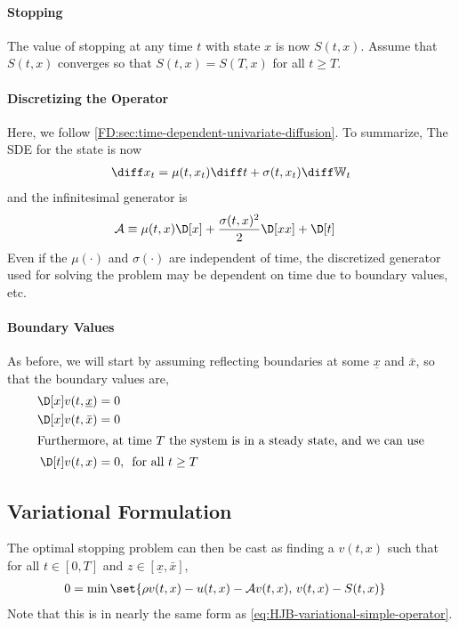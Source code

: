 \documentclass[11pt]{etk-article}
\begin{document}
\paragraph{Stopping}
The value of stopping at any time $t$ with state $x$ is now $S(t,x)$.  Assume that $S(t,x)$ converges so that $S(t,x) = S(T,x)$ for all $t \geq T$.

\paragraph{Discretizing the Operator}
Here, we follow \cref{FD:sec:time-dependent-univariate-diffusion}.  To summarize, 
 The SDE for the state is now \begin{align}
\diff x_t = \mu(t, x_t)\diff t + \sigma(t, x_t)\diff\mathbb{W}_t\label{eq:x-t-SDE}
\end{align}
and the infinitesimal generator is 
\begin{align}
\mathcal{A} &\equiv \mu(t,x)\D[x] + \frac{\sigma(t,x)^2}{2}\D[xx] + \D[t]\label{eq:A-generator-univariate-diffusion-t}
\end{align}
Even if the $\mu(\cdot)$ and $\sigma(\cdot)$ are independent of time, the discretized generator used for solving the problem may be dependent on time due to boundary values, etc.

\paragraph{Boundary Values}
As before, we will start by assuming reflecting boundaries at some $\underline{x}$ and $\bar{x}$, so that the boundary values are,
\begin{align}
\D[x]v(t,\underline{x}) &= 0\\
\D[x]v(t,\bar{x}) &= 0\\
\intertext{Furthermore, at time $T$ the system is in a steady state, and we can use}
\D[t]v(t,x) &= 0,\, \text{ for all } t \geq T\label{eq:D-steady-state-T}
\end{align} 

\subsection{Variational Formulation}
The optimal stopping problem can then be cast as finding a $v(t,x)$ such that for all $t\in[0,T]$ and $z\in[\underline{x},\bar{x}]$,
\begin{align}
0 &= \min\set{\rho v(t,x) - u(t,x) - \mathcal{A} v(t,x),\, v(t,x) - S(t,x) }\label{eq:HJB-variational-simple-operator-time-varying}
\end{align}	
Note that this is in nearly the same form as \cref{eq:HJB-variational-simple-operator}.
\end{document}
